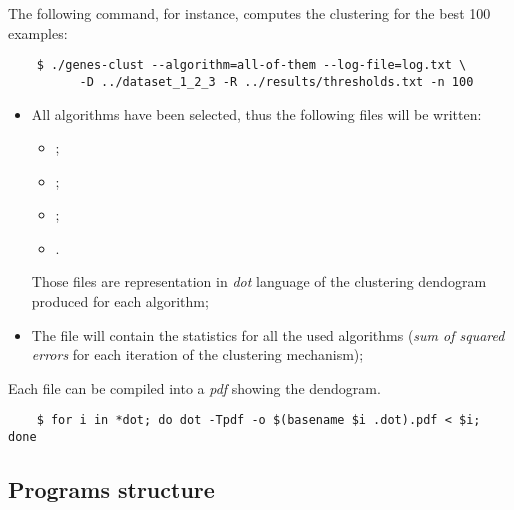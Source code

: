     The following command, for instance, computes the clustering for the
    best 100 examples:
    \begin{verbatim}
    $ ./genes-clust --algorithm=all-of-them --log-file=log.txt \
          -D ../dataset_1_2_3 -R ../results/thresholds.txt -n 100
    \end{verbatim}
    \begin{itemize}
    \item   All algorithms have been selected, thus the following files
            will be written:
            \begin{itemize}
            \item   {};
            \item   {};
            \item   {};
            \item   {}.
            \end{itemize}
            Those files are representation in \emph{dot} language of the
            clustering dendogram produced for each algorithm;
    \item   The file  will contain the statistics for
            all the used algorithms (\emph{sum of squared errors} for each
            iteration of the clustering mechanism);
    \end{itemize}

    Each  file can be compiled into a \emph{pdf} showing
    the dendogram.
    \begin{verbatim}
    $ for i in *dot; do dot -Tpdf -o $(basename $i .dot).pdf < $i; done
    \end{verbatim}

\subsection{ Programs structure }
